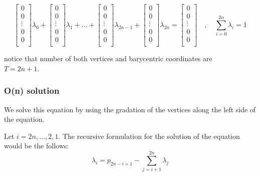 \begin{}
		\begin{equation}
		\begin{bmatrix} 0\\ 0\\ \vdots \\ 0\\ 0\\ \end{bmatrix} \lambda_0 + 
		\begin{bmatrix} 0\\ 0\\ \vdots \\ 0\\ 0\\ \end{bmatrix} \lambda_1 + 
		\dots +
		\begin{bmatrix} 0\\ 0\\ \vdots \\ 0\\ 0\\ \end{bmatrix} \lambda_{2n-1} + 
		\begin{bmatrix} 0\\ 0\\ \vdots \\ 0\\ 0\\ \end{bmatrix} \lambda_{2n}
		=
		\begin{bmatrix} 0\\ 0\\ \vdots \\ 0\\ 0\\ \end{bmatrix}  \quad , \quad
		\sum_{i=0}^{2n}\lambda_i = 1
		\end{equation} 
			
		
		notice that number of both vertices and barycentric coordinates are\\ $T = 2n + 1$.
		
		
		
		\subsubsection{O(n) solution}
		
		We solve this equation by using the gradation of the vertices along the left side of the equation.
		
		Let $i = 2n , \dots , 2,1$.
		The recursive formulation for the solution of the equation would be the follows:
		\begin{equation} \label{eq:3.14}
		\lambda_i = p_{2n-i+1} - \sum_{j=i+1}^{2n} \lambda_j
		\end{equation}
		

\end{}
